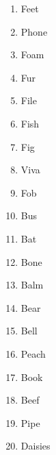 \begin{enumerate}
       \item  Feet
       \item  Phone
       \item  Foam
       \item  Fur
       \item  File
       \item  Fish
       \item  Fig
       \item  Viva
       \item  Fob
       \item  Bus
       \item  Bat
       \item  Bone
       \item  Balm
       \item  Bear
       \item  Bell
       \item  Peach
       \item  Book
       \item  Beef
       \item  Pipe
       \item  Daisies
   \end{enumerate}



